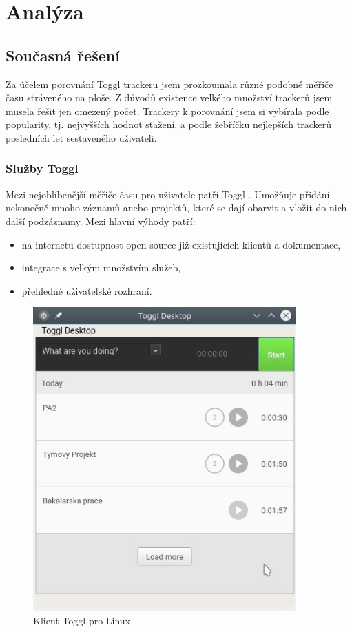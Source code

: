 \documentclass[thesis=B,czech]{FITthesis}[2012/06/26]
\begin{document}
\chapter{Analýza}

\section{Současná řešení}
Za účelem porovnání Toggl trackeru jsem prozkoumala různé podobné měřiče času stráveného na ploše. Z důvodů existence velkého množství trackerů jsem musela řešit jen omezený počet. Trackery k porovnání jsem si vybírala podle popularity, tj. nejvyšších hodnot stažení, a podle žebříčku nejlepších trackerů posledních let sestaveného uživateli.

\subsection{Služby Toggl}  

Mezi nejoblíbenější měřiče času pro uživatele patří Toggl \cite{toggl}. Umožňuje přidání nekonečně mnoho záznamů anebo projektů, které se dají obarvit a vložit do nich další podzáznamy. Mezi hlavní výhody patří: 
\begin{itemize}
	\item na internetu dostupnost open source již existujících klientů a dokumentace,
	\item integrace s velkým množstvím služeb,
	\item přehledné uživatelské rozhraní.
\end{itemize} 

\begin{figure}[h]\centering
	\includegraphics[width=0.9\textwidth]{toggl.jpg}
	\caption[Klient Toggl pro Linux]{Klient Toggl pro Linux}\label{fig:toggl}
\end{figure}
\end{document}
